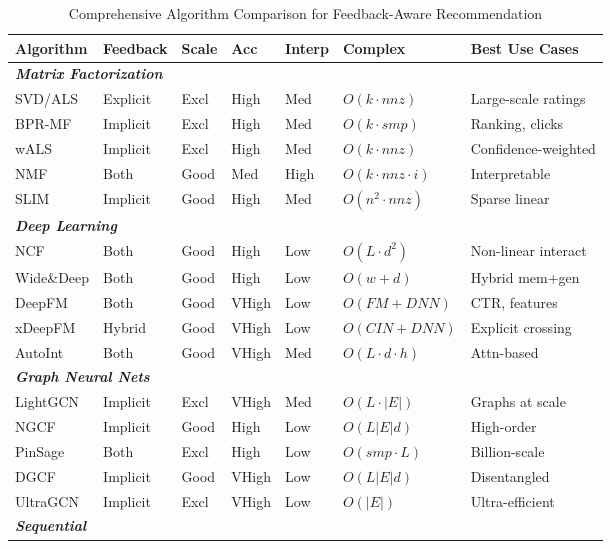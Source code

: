 \begin{table*}[ht]
\centering
\caption{Comprehensive Algorithm Comparison for Feedback-Aware Recommendation}
\label{tab:algorithm_comparison_eval}
\tiny
\begin{tabular}{@{}p{1.8cm}p{1.3cm}p{1.1cm}p{1cm}p{1cm}p{1.2cm}p{2.2cm}@{}}
\toprule
\textbf{Algorithm} & \textbf{Feedback} & \textbf{Scale} & \textbf{Acc} & \textbf{Interp} & \textbf{Complex} & \textbf{Best Use Cases} \\
\midrule
\multicolumn{7}{l}{\textit{\textbf{Matrix Factorization}}} \\
\midrule
SVD/ALS & Explicit & Excl & High & Med & $O(k \cdot nnz)$ & Large-scale ratings \\
BPR-MF & Implicit & Excl & High & Med & $O(k \cdot smp)$ & Ranking, clicks \\
wALS & Implicit & Excl & High & Med & $O(k \cdot nnz)$ & Confidence-weighted \\
NMF & Both & Good & Med & High & $O(k \cdot nnz \cdot i)$ & Interpretable \\
SLIM & Implicit & Good & High & Med & $O(n^2 \cdot nnz)$ & Sparse linear \\
\midrule
\multicolumn{7}{l}{\textit{\textbf{Deep Learning}}} \\
\midrule
NCF & Both & Good & High & Low & $O(L \cdot d^2)$ & Non-linear interact \\
Wide\&Deep & Both & Good & High & Low & $O(w + d)$ & Hybrid mem+gen \\
DeepFM & Both & Good & VHigh & Low & $O(FM+DNN)$ & CTR, features \\
xDeepFM & Hybrid & Good & VHigh & Low & $O(CIN+DNN)$ & Explicit crossing \\
AutoInt & Both & Good & VHigh & Med & $O(L \cdot d \cdot h)$ & Attn-based \\
\midrule
\multicolumn{7}{l}{\textit{\textbf{Graph Neural Nets}}} \\
\midrule
LightGCN & Implicit & Excl & VHigh & Med & $O(L \cdot |E|)$ & Graphs at scale \\
NGCF & Implicit & Good & High & Low & $O(L|E|d)$ & High-order \\
PinSage & Both & Excl & High & Low & $O(smp \cdot L)$ & Billion-scale \\
DGCF & Implicit & Good & VHigh & Low & $O(L|E|d)$ & Disentangled \\
UltraGCN & Implicit & Excl & VHigh & Low & $O(|E|)$ & Ultra-efficient \\
\midrule
\multicolumn{7}{l}{\textit{\textbf{Sequential}}} \\

\end{tabular}
\end{table*}
